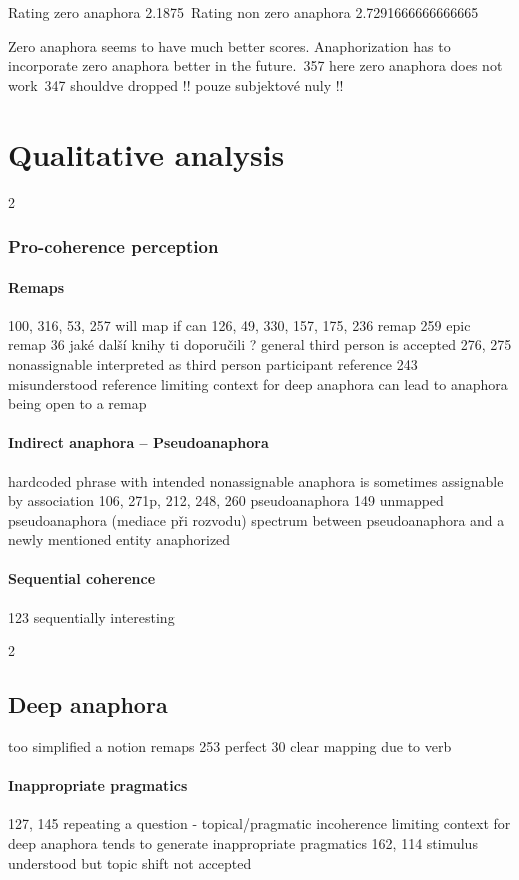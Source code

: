 Rating zero anaphora 2.1875\
Rating non zero anaphora 2.7291666666666665

Zero anaphora seems to have much better scores.
Anaphorization has to incorporate zero anaphora better in the future.\
357 here zero anaphora does not work\
347 shouldve dropped
!! pouze subjektové nuly !!

\section{Qualitative analysis}

2
\subsubsection{Pro-coherence perception}
\paragraph{Remaps}
    100, 316, 53, 257 will map if can
    126, 49, 330, 157, 175, 236 remap
    259 epic remap
    36 jaké další knihy ti doporučili ? general third person is accepted
    276, 275 nonassignable interpreted as third person participant reference
    243 misunderstood reference
    limiting context for deep anaphora can lead to anaphora being open to a remap
\paragraph{Indirect anaphora -- Pseudoanaphora}
    hardcoded phrase with intended nonassignable anaphora is sometimes assignable by association
    106, 271p, 212, 248, 260 pseudoanaphora
    149 unmapped pseudoanaphora (mediace při rozvodu)
    spectrum between pseudoanaphora and a newly mentioned entity anaphorized
\paragraph{Sequential coherence}
    123 sequentially interesting

2
\subsection{Deep anaphora}
    too simplified a notion
    remaps
    253 perfect
    30 clear mapping due to verb
\paragraph{Inappropriate pragmatics}
    127, 145 repeating a question - topical/pragmatic incoherence
        limiting context for deep anaphora tends to generate inappropriate pragmatics
    162, 114 stimulus understood but topic shift not accepted

